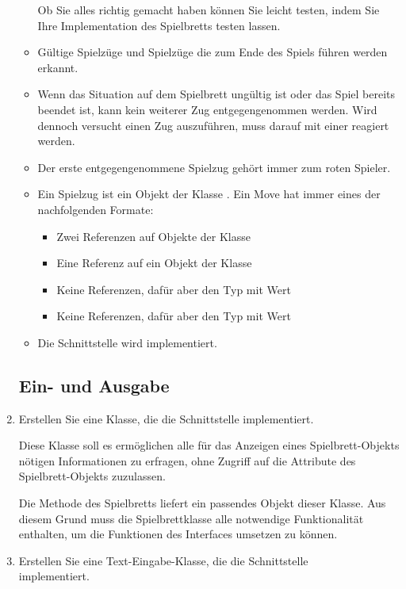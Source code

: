 \begin{enumerate}
\begin{itemize}
Ob Sie alles richtig gemacht haben können Sie leicht testen, indem Sie Ihre Implementation des Spielbretts testen lassen.
\item Gültige Spielzüge und Spielzüge die zum Ende des Spiels führen werden erkannt.
\item Wenn das Situation auf dem Spielbrett ungültig ist oder das Spiel bereits beendet ist, kann kein weiterer Zug entgegengenommen werden. Wird dennoch versucht einen Zug auszuführen, muss darauf mit einer  reagiert werden.
\item Der erste entgegengenommene Spielzug gehört immer zum roten Spieler.
\item Ein Spielzug ist ein Objekt der Klasse . Ein Move hat immer eines der nachfolgenden Formate:
\begin{itemize}
\item Zwei Referenzen auf Objekte der Klasse 
\item Eine Referenz auf ein Objekt der Klasse 
\item Keine Referenzen, dafür aber den Typ  mit Wert 
\item Keine Referenzen, dafür aber den Typ  mit Wert 
\end{itemize}
\item Die Schnittstelle  wird implementiert. 
\end{itemize}

\subsection*{Ein- und Ausgabe}
\item Erstellen Sie eine Klasse, die die Schnittstelle  implementiert.

Diese Klasse soll es ermöglichen alle für das Anzeigen eines Spielbrett-Objekts nötigen Informationen zu erfragen, ohne Zugriff auf die Attribute des Spielbrett-Objekts zuzulassen.

Die Methode  des Spielbretts liefert ein passendes Objekt dieser Klasse. Aus diesem Grund muss die Spielbrettklasse alle notwendige Funktionalität enthalten, um die Funktionen des  Interfaces umsetzen zu können.

\item Erstellen Sie eine Text-Eingabe-Klasse, die die Schnittstelle \\  implementiert.


\end{enumerate}
